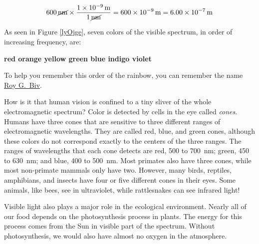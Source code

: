 \documentclass{article}
\numberwithin{equation}{section}
\numberwithin{figure}{section}
\begin{document}
\begin{equation*}
    \SI{600}{\cancel\nano\meter} \times \frac{\SI{1e-9}{m}}{\SI{1}{\cancel\nano\meter}} = \SI{600e-9}{m} = \SI{6.00e-7}{m}
\end{equation*}

\solutionEnd

\vspace{1ex}

As seen in Figure \ref{lyOjge}, seven colors of the visible spectrum, in order of increasing frequency, are:

\begin{mdframed}[backgroundcolor=black!10]
\begin{center}
    \textbf{\hspace{5mm}
    red \hfill
    orange \hfill
    yellow \hfill
    green \hfill
    blue \hfill 
    indigo \hfill 
    violet \hspace{3mm} \hfill}
\end{center}
\end{mdframed}

To help you remember this order of the rainbow, you can remember the name \href{https://youtu.be/Gf33ueRXMzQ}{Roy G.~Biv}.

\vspace{1em}

How is it that human vision is confined to a tiny sliver of the whole electromagnetic spectrum? Color is detected by cells in the eye called \textit{cones}. Humans have three cones that are sensitive to three different ranges of electromagnetic wavelengths. They are called red, blue, and green cones, although these colors do not correspond exactly to the centers of the three ranges. The ranges of wavelengths that each cone detects are red, 500 to \SI{700}{nm}; green, 450 to \SI{630}{nm}; and blue, 400 to \SI{500}{nm}. Most primates also have three cones, while most non-primate mammals only have two. However, many birds, reptiles, amphibians, and insects have four or five different cones in their eyes. Some animals, like bees, see in ultraviolet, while rattlesnakes can see infrared light!

\vspace{1em}

Visible light also plays a major role in the ecological environment. Nearly all of our food depends on the photosynthesis process in plants. The energy for this process comes from the Sun in visible part of the spectrum. Without photosynthesis, we would also have almost no oxygen in the atmosphere.
\end{document}
